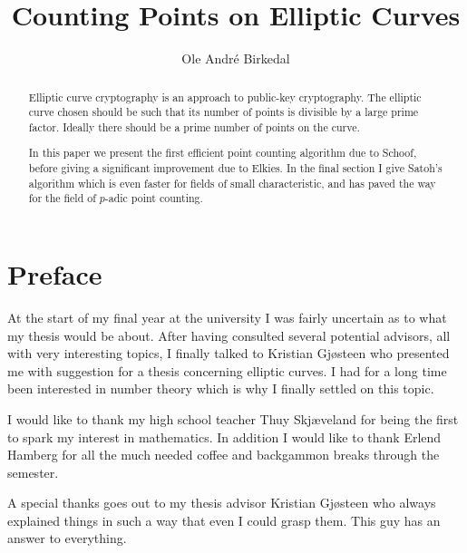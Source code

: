 \documentclass[a4paper,11pt,latin1]{amsart}
\title{Counting Points on Elliptic Curves}
\author{Ole Andr\'{e} Birkedal}
\begin{document}
\newtheorem{thm}{Theorem}
\newtheorem{mydef}{Definition}
\newtheorem{ex}{Example}
\newtheorem{prop}{Proposition}
\newtheorem{lemma}{Lemma}
\newtheorem{cor}{Corollary}

\begin{abstract}
Elliptic curve cryptography is an approach to public-key cryptography.
The elliptic curve chosen should be such that its number of points is divisible by
a large prime factor. Ideally there should be a prime number of points on the curve.

In this paper we present the first efficient point counting algorithm due to Schoof,
before giving a significant improvement due to Elkies. In the final section I give Satoh's
algorithm which is even faster for fields of small
characteristic, and has paved the way for the field of $p$-adic point counting.
\end{abstract}

\maketitle
\newpage
\section*{Preface}
At the start of my final year at the university I was fairly uncertain as to what my thesis would
be about. After having consulted several potential advisors, all with
very interesting topics, I finally talked to Kristian Gj\o steen
who presented me with suggestion for a thesis concerning elliptic curves.
I had for a long time been interested in number theory which is why I finally settled on this topic.

I would like to thank my high school teacher Thuy Skj\ae veland for being the first to spark
my interest in mathematics. In addition I would like to thank Erlend Hamberg for all the
much needed coffee and backgammon breaks through the semester.

A special thanks goes out to my thesis advisor Kristian Gj\o steen who always explained
things in such a way that even I could grasp them. This guy has an answer to everything.
\newpage
\tableofcontents












\nocite{*}
\end{document}
